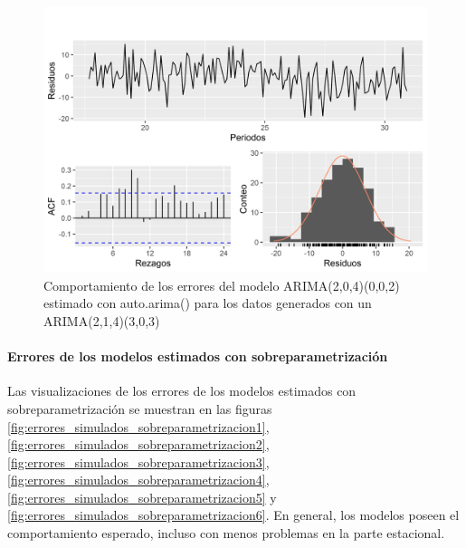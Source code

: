 \documentclass[
]{article}
\begin{document}
\begin{figure}[H]
\includegraphics[width=1\linewidth,height=1\textheight]{Tesis_files/figure-latex/errores_simulados_autoarima6-1} \caption{Comportamiento de los errores del modelo ARIMA(2,0,4)(0,0,2) estimado con auto.arima() para los datos generados con un ARIMA(2,1,4)(3,0,3)}\label{fig:errores_simulados_autoarima6}
\end{figure}

\paragraph{Errores de los modelos estimados con sobreparametrización}

Las visualizaciones de los errores de los modelos estimados con
sobreparametrización se muestran en las figuras
\ref{fig:errores_simulados_sobreparametrizacion1},
\ref{fig:errores_simulados_sobreparametrizacion2},
\ref{fig:errores_simulados_sobreparametrizacion3},
\ref{fig:errores_simulados_sobreparametrizacion4},
\ref{fig:errores_simulados_sobreparametrizacion5} y
\ref{fig:errores_simulados_sobreparametrizacion6}. En general, los
modelos poseen el comportamiento esperado, incluso con menos problemas
en la parte estacional.
\end{document}
